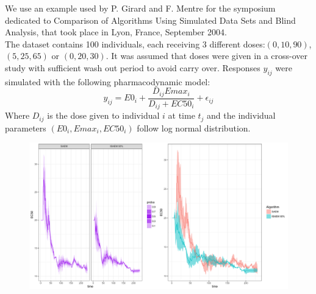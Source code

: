 \documentclass[a4paper]{article}
\theoremstyle{plain}
\theoremstyle{plain}
\theoremstyle{definition}
\begin{document}
We use an example used by P. Girard and F. Mentre for the symposium dedicated to Comparison of Algorithms Using Simulated Data Sets and Blind Analysis, that took place in Lyon, France, September 2004.\\
The dataset contains 100 individuals, each receiving 3 different doses:$(0, 10, 90)$, $(5, 25, 65)$ or $(0,20, 30)$. It was assumed that doses were given in a cross-over study with sufficient wash out period to avoid carry over. Responses $y_{ij}$ were simulated with the following pharmacodynamic model:
\begin{equation}
y_{ij} = E0_i + \frac{D_{ij} Emax_i}{D_{ij} + EC50_i} +\epsilon_{ij}
\end{equation}
Where $D_{ij}$ is the dose given to individual $i$ at time $t_j$ and the individual parameters $(E0_i,Emax_i,EC50_i)$ follow log normal distribution.

\begin{figure}[h]
\begin{center}
\includegraphics[scale=0.35]{isaem_pd_final.pdf}
\end{center}
\end{figure}
\end{document}
